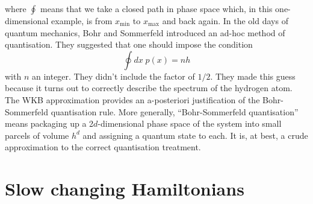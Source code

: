 \documentclass[cyan]{elegantnote}
\begin{document}
where $\oint$ means that we take a closed path in phase space which, in this one-dimensional example, is from $x_{\mathrm{min}}$ to $x_{\mathrm{max}}$ and back again.
In the old days of quantum mechanics, Bohr and Sommerfeld introduced an ad-hoc method of quantisation. They suggested that one should impose the condition
\[\oint dx \; p(x) = n h \]
with $n$ an integer. They didn't include the factor of $1/2$. They made this guess because it turns out to correctly describe the spectrum of the hydrogen atom.  The WKB approximation provides an a-posteriori justification of the Bohr-Sommerfeld quantisation rule.
More generally, ``Bohr-Sommerfeld quantisation'' means packaging up a 2$d$-dimensional phase space of the system into small parcels of volume $h^d$ and assigning a quantum state to each. It is, at best, a crude approximation to the correct quantisation treatment.

\section{Slow changing Hamiltonians}
\end{document}
